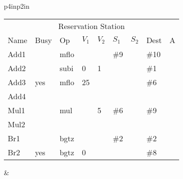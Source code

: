 \begin{tabular}{p{4in}p{2in}}
\noindent
\begin{tabular}{lllllllll}
\multicolumn{9}{c}{Reservation Station} \\
Name & Busy & Op   & $V_1$ & $V_2$ & $S_1$ & $S_2$ & Dest & A \\ \hline
Add1 &      & mflo &       &       & \#9   &       & \#10 &   \\
Add2 &      & subi & 0     & 1     &       &       & \#1  &   \\
Add3 & yes  & mflo & 25    &       &       &       & \#6  &   \\
Add4 &      &      &       &       &       &       &      &   \\ \hline
Mul1 &      & mul  &       & 5     & \#6   &       & \#9  &   \\
Mul2 &      &      &       &       &       &       &      &   \\ \hline
Br1  &      & bgtz &       &       & \#2   &       & \#2  &   \\
Br2  & yes  & bgtz & 0     &       &       &       & \#8  &   \\
\end{tabular} &  \\
\end{tabular}






